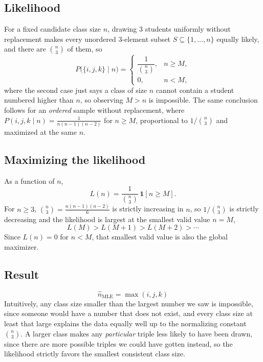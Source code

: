 \documentclass[11pt]{article}
\begin{document}
\subsection*{Likelihood}

For a fixed candidate class size $n$, drawing $3$ students uniformly without
replacement makes every unordered $3$-element subset
$S \subseteq \{1, \dots, n\}$ equally likely, and there are $\binom{n}{3}$ of
them, so
\[
  P\big(\{i,j,k\} \mid n\big) =
  \begin{cases}
    \dfrac{1}{\binom{n}{3}}, & n \ge M, \\[1.5ex]
    0, & n < M,
  \end{cases}
\]
where the second case just says a class of size $n$ cannot contain a student
numbered higher than $n$, so observing $M > n$ is impossible. The same
conclusion follows for an \emph{ordered} sample without replacement, where
$P(i,j,k \mid n) = \frac{1}{n(n-1)(n-2)}$ for $n \ge M$, proportional to
$1/\binom{n}{3}$ and maximized at the same $n$.

\subsection*{Maximizing the likelihood}

As a function of $n$,
\[
  L(n) = \frac{1}{\binom{n}{3}} \, \mathbf{1}[n \ge M].
\]
For $n \ge 3$, $\binom{n}{3} = \frac{n(n-1)(n-2)}{6}$ is strictly increasing in
$n$, so $1/\binom{n}{3}$ is strictly decreasing and the likelihood is largest at
the smallest valid value $n = M$,
\[
  L(M) > L(M+1) > L(M+2) > \cdots
\]
Since $L(n) = 0$ for $n < M$, that smallest valid value is also the global
maximizer.

\subsection*{Result}
\[
  \boxed{\hat n_{\mathrm{MLE}} = \max(i, j, k)}
\]
Intuitively, any class size smaller than the largest number we saw is
impossible, since someone would have a number that does not exist, and every
class size at least that large explains the data equally well up to the
normalizing constant $\binom{n}{3}$. A larger class makes any \emph{particular}
triple less likely to have been drawn, since there are more possible triples we
could have gotten instead, so the likelihood strictly favors the smallest
consistent class size.
\end{document}
